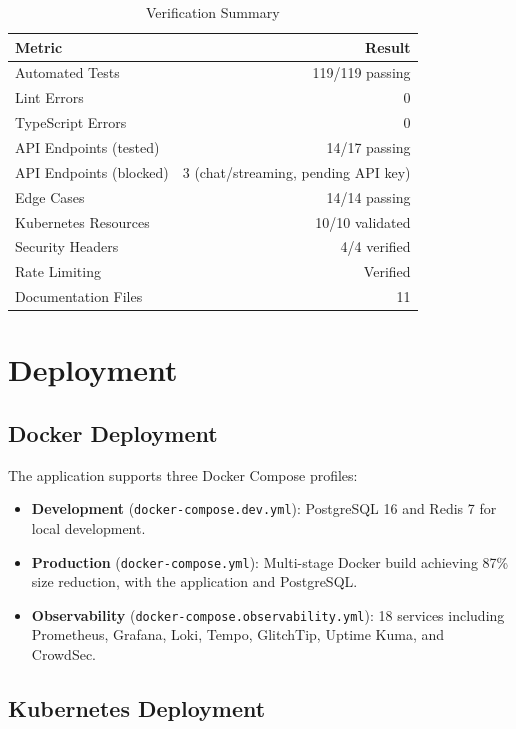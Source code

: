 \documentclass[conference]{IEEEtran}
\begin{document}
\begin{table}[t]
\centering
\caption{Verification Summary}
\label{tab:testresults}
\begin{tabular}{lr}
\toprule
\textbf{Metric} & \textbf{Result} \\
\midrule
Automated Tests & 119/119 passing \\
Lint Errors & 0 \\
TypeScript Errors & 0 \\
API Endpoints (tested) & 14/17 passing \\
API Endpoints (blocked) & 3 (chat/streaming, pending API key) \\
Edge Cases & 14/14 passing \\
Kubernetes Resources & 10/10 validated \\
Security Headers & 4/4 verified \\
Rate Limiting & Verified \\
Documentation Files & 11 \\
\bottomrule
\end{tabular}
\end{table}

\section{Deployment}

\subsection{Docker Deployment}

The application supports three Docker Compose profiles:

\begin{itemize}
  \item \textbf{Development} (\texttt{docker-compose.dev.yml}): PostgreSQL 16 and Redis 7 for local development.
  \item \textbf{Production} (\texttt{docker-compose.yml}): Multi-stage Docker build achieving 87\% size reduction, with the application and PostgreSQL.
  \item \textbf{Observability} (\texttt{docker-compose.observability.yml}): 18 services including Prometheus, Grafana, Loki, Tempo, GlitchTip, Uptime Kuma, and CrowdSec.
\end{itemize}

\subsection{Kubernetes Deployment}
\end{document}
